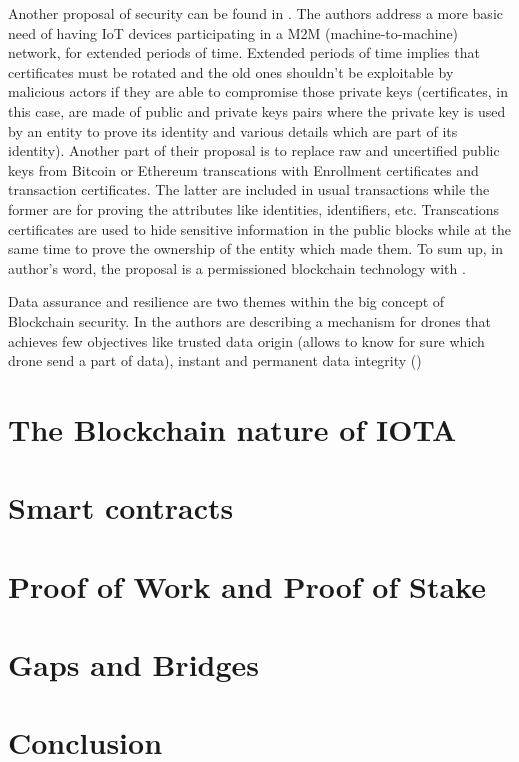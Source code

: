 \documentclass[a4paper,12pt,twoside]{book}
\begin{document}
    Another proposal of security can be found in \cite{SecuringUserIdentity}. The authors address a more basic need of having IoT devices participating in a M2M (machine-to-machine) network, for extended periods of time. Extended periods of time implies that certificates must be rotated and the old ones shouldn't be exploitable by malicious actors if they are able to compromise those private keys (certificates, in this case, are made of public and private keys pairs where the private key is used by an entity to prove its identity and various details which are part of its identity). Another part of their proposal is to replace raw and uncertified public keys from Bitcoin or Ethereum transcations with Enrollment certificates and transaction certificates. The latter are included in usual transactions while the former are for proving the attributes like identities, identifiers, etc. Transcations certificates are used to hide sensitive information in the public blocks while at the same time to prove the ownership of the entity which made them. To sum up, in author's word, the proposal is a permissioned blockchain technology with .

    Data assurance and resilience are two themes within the big concept of Blockchain security. In \cite{TowardsdatAassuranceAndResilience} the authors are describing a mechanism for drones that achieves few objectives like trusted data origin (allows to know for sure which drone send a part of data), instant and permanent data integrity ()


\section{The Blockchain nature of IOTA}
\label{sec:IOTABlockchainNature}

\section{Smart contracts}
\label{sec:SmartContracts}

\section{Proof of Work and Proof of Stake}
\label{sec:PoWandPoS}


\section{Gaps and Bridges}
\label{sec:GapsBridges}

\section{Conclusion}
\label{sec:Conclusion}


\end{document}
